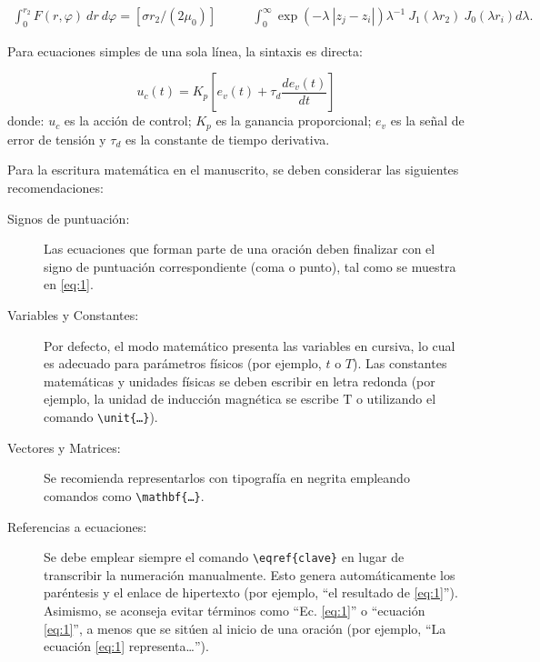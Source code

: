\documentclass[a4paper, 12pt]{article}
\begin{document}
\begin{equation} \label{eq:1}
  \begin{split}
    \int^{r_2}_0 F(r, \varphi)\ dr\ d\varphi = \left[\sigma r_2 / (2\mu_0)\right]
  \end{split}
  \qquad
  \begin{split}
    \int^\infty_0 \exp(-\lambda\ |z_j-z_i|)\lambda^{-1}\ J_1(\lambda r_2)\ J_0(\lambda r_i) d\lambda.
  \end{split}
\end{equation}

Para ecuaciones simples de una sola línea, la sintaxis es directa:

\begin{equation} \label{eq:2}
  u_c(t) = K_p \left[e_v(t)+\tau_d\frac{de_v(t)}{dt}\right]
\end{equation}
donde: $u_c$ es la acción de control; $K_p$ es la ganancia proporcional; $e_v$ es la señal de error de tensión y $\tau_d$ es la constante de tiempo derivativa.

Para la escritura matemática en el manuscrito, se deben considerar las siguientes recomendaciones:
\begin{description}
  \item[Signos de puntuación:] Las ecuaciones que forman parte de una oración deben finalizar con el signo de puntuación correspondiente (coma o punto), tal como se muestra en \eqref{eq:1}.
  \item[Variables y Constantes:] Por defecto, el modo matemático presenta las variables en cursiva, lo cual es adecuado para parámetros físicos (por ejemplo, $t$ o $T$). Las constantes matemáticas y unidades físicas se deben escribir en letra redonda (por ejemplo, la unidad de inducción magnética se escribe $\mathrm{T}$ o utilizando el comando \texttt{\textbackslash unit\allowbreak \{\dots\}}).
  \item[Vectores y Matrices:] Se recomienda representarlos con tipografía en negrita empleando comandos como \texttt{\textbackslash mathbf\allowbreak \{\dots\}}.
  \item[Referencias a ecuaciones:] Se debe emplear siempre el comando \texttt{\textbackslash eqref\allowbreak \{clave\}} en lugar de transcribir la numeración manualmente. Esto genera automáticamente los paréntesis y el enlace de hipertexto (por ejemplo, “el resultado de \eqref{eq:1}”). Asimismo, se aconseja evitar términos como “Ec. \eqref{eq:1}” o “ecuación \eqref{eq:1}”, a menos que se sitúen al inicio de una oración (por ejemplo, “La ecuación \eqref{eq:1} representa\dots”).
\end{description}
\end{document}
